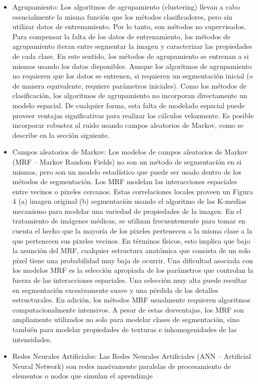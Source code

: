 \begin{itemize}
\item Agrupamiento: Los algoritmos de agrupamiento (clustering) llevan a cabo esencialmente la misma
funci\'on que los m\'etodos clasificadores, pero sin utilizar datos de entrenamiento. Por lo tanto, son m\'etodos no supervisados. Para compensar la falta de los datos de entrenamiento, los m\'etodos de agrupamiento iteran entre segmentar la imagen y caracterizar las propiedades de cada clase. En este sentido, los m\'etodos de agrupamiento se entrenan a si mismos usando los datos disponibles. 
Aunque los algoritmos de agrupamiento no requieren que los datos se entrenen, si requieren un segmentaci\'on inicial (o de manera equivalente, requiere par\'ametros iniciales). Como los m\'etodos de clasificaci\'on, los algoritmos de agrupamiento no incorporan directamente un modelo espacial. De cualquier forma, esta falta de modelado espacial puede proveer ventajas significativas para realizar los c\'alculos velozmente. Es posible incorporar robustez al ruido usando campos aleatorios de Markov, como se describe en la sección siguiente.
\item Campos aleatorios de Markov: Los modelos de campos aleatorios de Markov (MRF – Markov Random Fields) no son un m\'etodo de segmentaci\'on en si mismos, pero son un modelo estad\'istico que puede ser usado dentro de los m\'etodos de segmentaci\'on. Los MRF modelan las interacciones espaciales entre vecinos o pixeles cercanos. Estas correlaciones locales proveen un Figura 4 (a) imagen original (b) segmentaci\'on usando el algoritmo de las K-medias mecanismo para modelar una variedad de propiedades de la imagen. En el tratamiento de im\'agenes m\'edicas, se utilizan frecuentemente para tomar en cuenta el hecho que la mayor\'ia de los pixeles pertenecen a la misma clase a la que pertenecen sus pixeles vecinos. En t\'erminos f\'isicos, esto implica que bajo la asunci\'on del MRF, cualquier estructura anat\'omica que consista de un solo p\'ixel tiene una probabilidad muy baja de ocurrir. Una dificultad asociada con los modelos MRF es la selección apropiada de los par\'ametros que controlan la fuerza de las interacciones espaciales. Una selecci\'on muy alta puede resultar en segmentaci\'on excesivamente suave y una p\'erdida de los detalles estructurales. En adici\'on, los m\'etodos MRF usualmente requieren algoritmos computacionalmente intensivos. A pesar de estas desventajas, los MRF son ampliamente utilizados no solo para modelar clases de segmentaci\'on, sino tambi\'en para modelar propiedades de texturas e inhomogenidades de las intensidades.
\item Redes Neurales Artificiales: Las Redes Neurales Artificiales (ANN – Artificial Neural Network) son redes masivamente paralelas de procesamiento de elementos o nodos que simulan el aprendizaje

\end{itemize}
